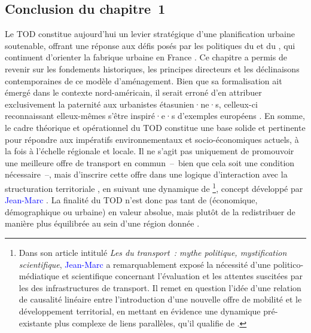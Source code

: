 \begin{refsegment}
\section*{Conclusion du chapitre~1
    \label{chap1:conclusion}
    }

Le \acrfull{TOD} constitue aujourd’hui un levier stratégique d'une planification urbaine soutenable, offrant une réponse aux défis posés par les politiques du  et du , qui continuent d’orienter la fabrique urbaine en France \textcolor{blue}{\autocite[14]{sebban_complementarite_2003}}. Ce chapitre a permis de revenir sur les fondements historiques, les principes directeurs et les déclinaisons contemporaines de ce modèle d’aménagement. Bien que sa formalisation ait émergé dans le contexte nord-américain, il serait erroné d’en attribuer exclusivement la paternité aux urbanistes étasunien·ne·s, celleux-ci reconnaissant elleux-mêmes s’être inspiré·e·s d’exemples européens \textcolor{blue}{\autocite[15]{renne_emerging_2004}}. En somme, le cadre théorique et opérationnel du \acrshort{TOD} constitue une base solide et pertinente pour répondre aux impératifs environnementaux et socio-économiques actuels, à la fois à l’échelle régionale et locale. Il ne s’agit pas uniquement de promouvoir une meilleure offre de transport en commun~–~bien que cela soit une condition nécessaire~–, mais d’inscrire cette offre dans une logique d’interaction avec la structuration territoriale \textcolor{blue}{\autocite[9]{bernier_atlas_2023}}, en suivant une dynamique de \footnote{
    Dans son article intitulé \textsl{Les  du transport~: mythe politique, mystification scientifique}, \textcolor{blue}{Jean-Marc} \textcolor{blue}{\textcite[239]{offner__1993}} a remarquablement exposé la nécessité d’une  politico-médiatique et scientifique concernant l’évaluation et les attentes suscitées par les  des infrastructures de transport. Il remet en question l’idée d’une relation de causalité linéaire entre l’introduction d’une nouvelle offre de mobilité et le développement territorial, en mettant en évidence une dynamique pré-existante plus complexe de liens parallèles, qu’il qualifie de .
}, concept développé par \textcolor{blue}{Jean-Marc} \textcolor{blue}{\textcite[239]{offner__1993}}. La finalité du \acrshort{TOD} n’est donc pas tant de  (économique, démographique ou urbaine) en valeur absolue, mais plutôt de la redistribuer de manière plus équilibrée au sein d’une région donnée \textcolor{blue}{\autocite[82]{cervero_transit_1998}}.%


\end{refsegment}

